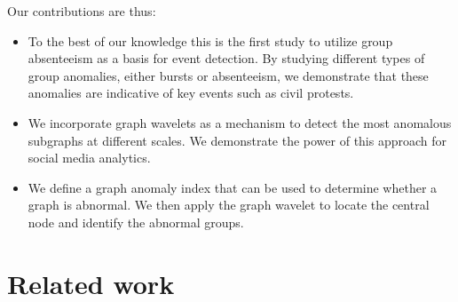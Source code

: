\documentclass[twoside,leqno,twocolumn]{article}
\begin{document}
Our contributions are thus:
\begin{itemize}
\item To the best of our knowledge this is the first study to utilize group absenteeism as a basis for event detection. By studying different types of group anomalies, either bursts or absenteeism, we demonstrate that these anomalies are indicative of key events such as civil protests.
\item We incorporate graph wavelets as a mechanism to detect the most anomalous subgraphs at different scales. We demonstrate the power of this approach for social media analytics.
\item We define a graph anomaly index that can be used to determine whether a graph is abnormal. We then apply the graph wavelet to locate the central node and identify the abnormal groups.
\end{itemize}




\section{Related work} \label{sec:related}
\end{document}
